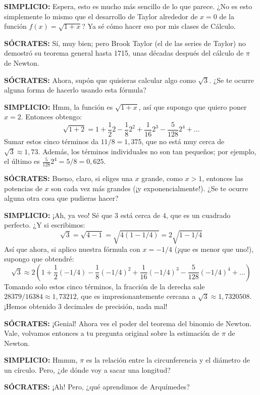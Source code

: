 \noindent \textbf{SIMPLICIO:} Espera, esto es mucho más sencillo de lo
que parece. ¿No es esto simplemente lo mismo que el desarrollo de Taylor
alrededor de $x = 0$ de la función $f(x) = \sqrt{1 + x}$? Ya sé cómo
hacer eso por mis clases de Cálculo.

\noindent \textbf{SÓCRATES:} Sí, muy bien; pero Brook Taylor (el de las
series de Taylor) no demostró su teorema general hasta 1715, unas
décadas después del cálculo de $\pi$ de Newton.

\noindent \textbf{SÓCRATES:} Ahora, supón que quisieras calcular algo
como $\sqrt{3}$. ¿Se te ocurre alguna forma de hacerlo usando esta
fórmula?

\noindent \textbf{SIMPLICIO:} Hmm, la función es $\sqrt{1 + x}$, así que
supongo que quiero poner $x = 2$. Entonces obtengo:
\[ \sqrt{1 + 2} = 1 + \frac{1}{2}2 - \frac{1}{8}2^2 + \frac{1}{16}2^3 - \frac{5}{128}2^4 + \dots \]
Sumar estos cinco términos da $11/8 = 1,375$, que no está muy cerca de
$\sqrt{3} \approx 1,73$. Además, los términos individuales no son tan
pequeños; por ejemplo, el último es $\frac{5}{128}2^4 = 5/8 = 0,625$.

\noindent \textbf{SÓCRATES:} Bueno, claro, si eliges una $x$ grande,
como $x > 1$, entonces las potencias de $x$ son cada vez más grandes (¡y
exponencialmente!). ¿Se te ocurre alguna otra cosa que pudieras hacer?

\noindent \textbf{SIMPLICIO:} ¡Ah, ya veo! Sé que $3$ está cerca de $4$,
que es un cuadrado perfecto. ¿Y si escribimos:
\[ \sqrt{3} = \sqrt{4 - 1} = \sqrt{4(1 - 1/4)} = 2\sqrt{1 - 1/4} \]
Así que ahora, si aplico nuestra fórmula con $x = -1/4$ (¡que es menor
que uno!), supongo que obtendré:
\[ \sqrt{3} \approx 2 \left( 1 + \frac{1}{2}(-1/4) - \frac{1}{8}(-1/4)^2 + \frac{1}{16}(-1/4)^3 - \frac{5}{128}(-1/4)^4 + \dots \right) \]
Tomando solo estos cinco términos, la fracción de la derecha sale
$28379/16384 \approx 1,73212$, que es impresionantemente cercana a $\sqrt{3} \approx
1,7320508$. ¡Hemos obtenido 3 decimales de precisión, nada mal!

\noindent \textbf{SÓCRATES:} ¡Genial! Ahora ves el poder del teorema del
binomio de Newton. Vale, volvamos entonces a tu pregunta original sobre
la estimación de $\pi$ de Newton.

\noindent \textbf{SIMPLICIO:} Hmmm, $\pi$ es la relación entre la
circunferencia y el diámetro de un círculo. Pero, ¿de dónde voy a sacar
una longitud?

\noindent \textbf{SÓCRATES:} ¡Ah! Pero, ¿qué aprendimos de Arquímedes?

